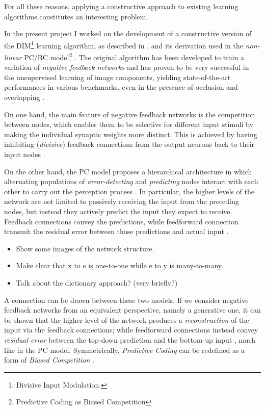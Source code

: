 \documentclass[11pt,a4paper]{report}
\begin{document}
			For all these reasons, applying a constructive approach to existing learning algorithms constitutes an interesting problem.
		
			\newpage
		
			In the present project I worked on the development of a constructive version of the DIM\footnote{Divisive Input Modulation.} learning algorithm, as described in \cite{spratling2009unsupervised}, and its derivation \cite{spratling2012unsupervised} used in the \emph{non-linear} PC/BC model\footnote{Predictive Coding as Biased Competition} \cite{spratling2008predictive}. The original algorithm has been developed to train a variation of \emph{negative feedback networks} and has proven to be very successful in the unsupervised learning of image components, yielding state-of-the-art performances in various benchmarks, even in the presence of occlusion and overlapping \cite{spratling2009unsupervised}.
		
			On one hand, the main feature of negative feedback networks is the competition between nodes, which enables them to be selective for different input stimuli by making the individual synaptic weights more distinct. This is achieved by having inhibiting (\emph{divisive}) feedback connections from the output neurons back to their input nodes \cite{spratling2009unsupervised}. 
		
			On the other hand, the PC model proposes a hierarchical architecture in which alternating populations of \emph{error-detecting} and \emph{predicting} nodes interact with each other to carry out the perception process \cite{spratling2014predictive}. In particular, the higher levels of the network are not limited to passively receiving the input from the preceding nodes, but instead they actively predict the input they expect to receive. Feedback connections convey the predictions, while feedforward connection transmit the residual error between those predictions and actual input \cite{spratling2008predictive}.

			\begin{itemize}
				\item Show some images of the network structure.
				\item Make clear that x to e is one-to-one while e to y is many-to-many.
				\item Talk about the dictionary approach? (very briefly?)
			\end{itemize}

			A connection can be drawn between these two models. If we consider negative feedback networks from an equivalent perspective, namely a generative one, it can be shown that the higher level of the network produces a \emph{reconstruction} of the input via the feedback connections; while feedforward connections instead convey \emph{residual error} between the top-down prediction and the bottom-up input \cite{spratling2009unsupervised}, much like in the PC model. Symmetrically, \emph{Predictive Coding} can be redefined as a form of \emph{Biased Competition} \cite{spratling2008predictive}.
		
\end{document}
